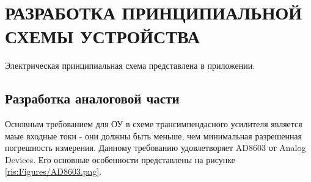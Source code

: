 \begin{sloppypar} %
\newpage %
\section{РАЗРАБОТКА ПРИНЦИПИАЛЬНОЙ СХЕМЫ УСТРОЙСТВА} %
Электрическая принципиальная схема представлена в приложении.
\subsection{Разработка аналоговой части}
Основным требованием для ОУ в схеме трансимпендасного усилителя является маые входные токи - они должны быть меньше, чем минимальная разрешенная погрешность измерения. Данному требованию удовлетворяет AD8603 от Analog Devices.
Его основные особенности представлены на рисунке \ref{ris:Figures/AD8603.png}.















\end{sloppypar}
